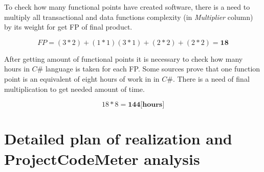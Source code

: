 \documentclass[a4paper,11pt,onecolumn,oneside]{book}
\begin{document}
To check how many functional points have created software, there is a need to multiply all transactional and data functions complexity (in \textit{Multiplier} column) by its weight for get FP of final product.

\[
FP = (3\ast2 )+(1\ast1)(3\ast1)+(2\ast2)+(2\ast2)= \textbf{18}
\]

After getting amount of functional points it is necessary to check how many hours in $C\#$ language is taken for each FP.  Some sources prove that one function point is an equivalent of eight hours of work in in $C\#$. There is a need of final multiplication to get needed amount of time.

\[
18\ast8 =  \textbf{144[hours]}
\]

\section{Detailed plan of realization and ProjectCodeMeter analysis}
\end{document}
